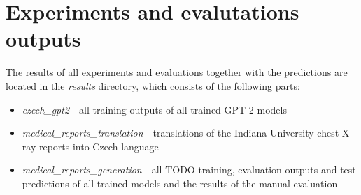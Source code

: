 \documentclass[12pt,a4paper]{report}
\let\openright=\clearpage
\begin{document}
\section{Experiments and evalutations outputs}
\label{add:Outputs}
The results of all experiments and evaluations together with the predictions are located in the \textit{results} directory, which consists of the following parts:
\begin{itemize}
	\item \textit{czech\_gpt2} - all training outputs of all trained GPT-2 models
	\item \textit{medical\_reports\_translation} - translations of the Indiana University chest X-ray reports into Czech language
	\item \textit{medical\_reports\_generation} - all TODO training, evaluation outputs and test predictions of all trained models and the results of the manual evaluation
\end{itemize}

\openright
\end{document}
